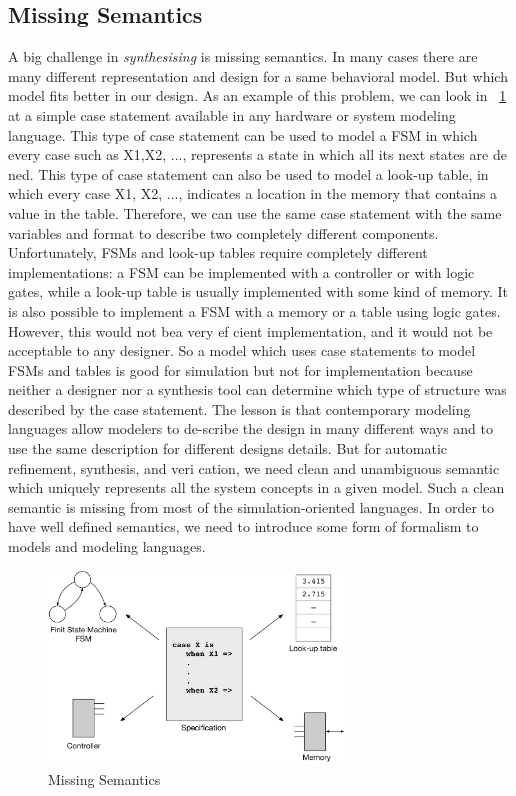 \subsection{Missing Semantics}
\label{sec:missing_semantics}

A big challenge in \emph{synthesising} is missing semantics. In many cases there are many different representation and design for a same behavioral model. But which model fits better in our design. 
As an example of this problem, we can look in ~\ref{fig:missing_semantics} at a simple case statement available in any hardware or system modeling language.
This type of case statement can be used to model a FSM in which every case such as X1,X2, ..., represents a state in which all its next states are de ned.
This type of case statement can also be used to model a look-up table, in which every case X1, X2, ..., indicates a location in the memory that contains a value in the table.
Therefore,  we can use the same case statement with the same variables and format to describe two completely different components.
Unfortunately, FSMs and look-up tables require completely different implementations:  a FSM can be implemented with a controller or with logic gates, while a look-up table is usually implemented with some kind of memory.
It is also possible to implement a FSM with a memory or a table using logic gates.
However, this would not bea very ef cient implementation, and it would not be acceptable to any designer.
So a model which uses case statements to model FSMs and tables is good for simulation but not for implementation because neither a designer nor a synthesis tool can determine which type of structure was described by the case statement.
The lesson is that contemporary modeling languages allow modelers to de-scribe the design in many different ways and to use the same description for different designs details. But for automatic refinement, synthesis, and veri cation, we need clean and unambiguous semantic which uniquely represents all the system concepts in a given model.  Such a clean semantic is missing from most of the simulation-oriented  languages.
In order to have well defined semantics, we need to introduce some form of formalism to models and modeling languages.


\begin{figure}[h]
    \centering
    \includegraphics[width=0.7\textwidth]{figures/Introduction/Missing_Semantics.pdf}
    \caption{Missing Semantics}
    \label{fig:missing_semantics}
\end{figure}




